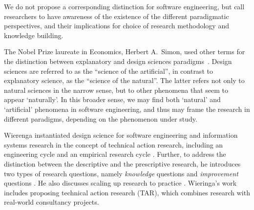 \documentclass[graybox]{svmult}
\newcommand{\per}[1]{\textcolor{cyan}{{\it [Per says: #1]}}}
\newcommand{\per}[1]{}
\begin{document}
We do not propose a corresponding distinction for software engineering, but call researchers to have awareness of the existence of the different paradigmatic perspectives, and their implications for choice of research methodology and knowledge building.

The Nobel Prize laureate in Economics, Herbert A.\ Simon, used other terms for the distinction between explanatory and design sciences paradigms~\cite{Simons69}. Design sciences are referred to as the ``science of the artificial'', in contrast to explanatory science, as the ``science of the natural''. The latter refers not only to natural sciences in the narrow sense, but to other phenomena that seem to appear `naturally'. In this broader sense, we may find both `natural' and `artificial' phenomena in software engineering, and thus may frame the research in different paradigms, depending on the phenomenon under study. 



Wierenga instantiated design science for software engineering and information systems research in the concept of technical action research, including an engineering cycle and an empirical research cycle \cite{wieringa_six_2015,wieringa_technical_2012,wieringa_what_2014}. Further, to address the distinction between the descriptive and the prescriptive research, he introduces two types of research questions, namely \emph{knowledge} questions and \emph{improvement} questions \cite{wieringa_design_2009}. He also discusses scaling up research to practice \cite{Wieringa2014}. Wieringa's work includes proposing technical action research (TAR), which combines research with real-world consultancy projects.



\end{document}
